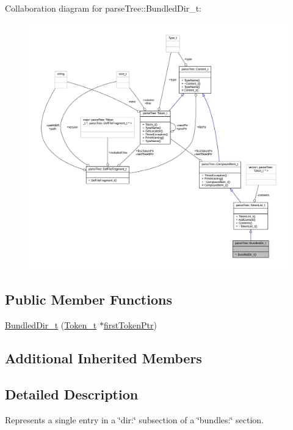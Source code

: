 Collaboration diagram for parse\+Tree\+:\+:Bundled\+Dir\+\_\+t\+:
\nopagebreak
\begin{figure}[H]
\begin{center}
\leavevmode
\includegraphics[width=350pt]{structparse_tree_1_1_bundled_dir__t__coll__graph}
\end{center}
\end{figure}
\subsection*{Public Member Functions}
\begin{DoxyCompactItemize}
\item 
\hyperlink{structparse_tree_1_1_bundled_dir__t_ad8ed8abd6f4565085986e06413e7a924}{Bundled\+Dir\+\_\+t} (\hyperlink{structparse_tree_1_1_token__t}{Token\+\_\+t} $\ast$\hyperlink{structparse_tree_1_1_compound_item__t_a587020c943e760cb0152dd8cd31e21ef}{first\+Token\+Ptr})
\end{DoxyCompactItemize}
\subsection*{Additional Inherited Members}


\subsection{Detailed Description}
Represents a single entry in a \char`\"{}dir\+:\char`\"{} subsection of a \char`\"{}bundles\+:\char`\"{} section. 

